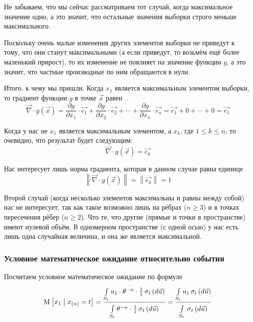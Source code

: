 Не забываем, что мы сейчас рассматриваем тот случай,
когда максимальное значение одно, а это значит,
что остальные значения выборки строго меньше максимального.

Поскольку очень малые изменения других элементов выборки не приведут к тому,
что они станут максимальными (а если приведут, то возьмём ещё более
маленький прирост), то их изменение не повлияет на значение функции $g$,
а это значит, что частные производные по ним обращаются в нули.

Итого, к чему мы пришли.
Когда $x_1$ является максимальным элементом выборки,
то градиент функции $g$ в точке $\vec{x}$ равен
$$\vec{\nabla} \cdot g\left( \vec{x} \right)
    = \frac{\partial g}{\partial x_1} \cdot \vec{e_1}
        + \frac{\partial g}{\partial x_2} \cdot \vec{e_2}
        + \cdots
        + \frac{\partial g}{\partial x_n} \cdot \vec{e_n}
    = \vec{e_1} + 0 + \cdots + 0 = \vec{e_1}$$

Когда у нас не $x_1$ является максимальным элементом, а $x_k$,
где $1 \le k \le n$, то очевидно, что результат будет следующим:
$$\vec{\nabla} \cdot g\left( \vec{x} \right) = \vec{e_k}$$

Нас интересует лишь норма градиента, которая в данном случае равна единице
$$\left\| \vec{\nabla} \cdot g\left( \vec{x} \right) \right\|
    = \left\| \vec{e_k} \right\| = 1$$

Второй случай (когда несколько элементов максимальны и равны между собой)
нас не интересует, так как такое возможно лишь на рёбрах ($n \ge 3$) и в точках
пересечения рёбер ($n \ge 2$).
Что те, что другие (прямые и точки в пространстве) имеют нулевой объём.
В одномерном пространстве (с одной осью) у нас есть лишь одна
случайная величина, и она же является максимальной.

\subsubsection{Условное математическое ожидание относительно события}
Посчитаем условное математическое ожидание по формуле
\begin{align*}
    \Mean{x_1 \mcond x_{\left( n \right)} = t}
        = \frac{\integrall{S_t}{
                    \sigma_{t}\left(d\vec{u} \right)}{
                    u_1 \cdot \theta^{-n} \cdot \frac{1}{1}}}
                {\integrall{S_t}{\sigma_{t}\left(d\vec{u} \right)}{
                    \theta^{-n} \cdot \frac{1}{1}}}
        = \frac{\integrall{S_t}{
                    \sigma_{t}\left(d\vec{u} \right)}{u_1}}{
                \integrall{S_t}{
                    \sigma_{t}\left(d\vec{u} \right)}{}}
\end{align*}

